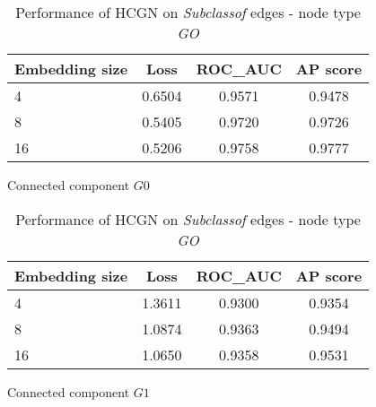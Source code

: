 \begin{table}[h]
    \centering
    
    
    \begin{subtable}[t]{\textwidth}
        \centering
        \begin{tabular}{lccc}        
            \toprule
            \textbf{Embedding size} & \textbf{Loss} & \textbf{ROC\_AUC} & \textbf{AP score} \\
            \midrule
            4 & 0.6504 & 0.9571 & 0.9478 \\
            8 & 0.5405 & 0.9720 & 0.9726 \\
            16 & 0.5206 & 0.9758 & 0.9777 \\
            \bottomrule
        \end{tabular}
        \caption{Connected component $G0$}
    \end{subtable}
    
    \vspace{1em}
    
    \begin{subtable}[t]{\textwidth}
        \centering
        \begin{tabular}{lccc}        
            \toprule
            \textbf{Embedding size} & \textbf{Loss} & \textbf{ROC\_AUC} & \textbf{AP score} \\
            \midrule
            4 & 1.3611 & 0.9300 & 0.9354 \\
            8 & 1.0874 & 0.9363 & 0.9494 \\
            16 & 1.0650 & 0.9358 & 0.9531 \\

            \bottomrule
        \end{tabular}
        \caption{Connected component $G1$}
    \end{subtable}
    \caption{Performance of HCGN on \textit{Subclassof} edges - node type \textit{GO}}
\end{table}

